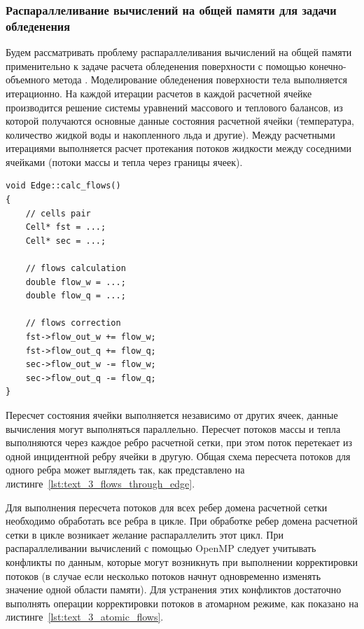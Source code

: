 \subsubsection{Распараллеливание вычислений на общей памяти для задачи обледенения}\label{sec:text_3_edge_coloring}

Будем рассматривать проблему распараллеливания вычислений на общей памяти применительно к задаче расчета обледенения поверхности с помощью конечно-объемного метода \cite{Gulicheva2024}.
Моделирование обледенения поверхности тела выполняется итерационно.
На каждой итерации расчетов в каждой расчетной ячейке производится решение системы уравнений массового и теплового балансов, из которой получаются основные данные состояния расчетной ячейки (температура, количество жидкой воды и накопленного льда и другие).
Между расчетными итерациями выполняется расчет протекания потоков жидкости между соседними ячейками (потоки массы и тепла через границы ячеек).

\begin{lstlisting}[caption={Расчет протекания потоков через ребро сетки.}, label={lst:text_3_flows_through_edge}]
void Edge::calc_flows()
{
    // cells pair
    Cell* fst = ...;
    Cell* sec = ...;

    // flows calculation
    double flow_w = ...;
    double flow_q = ...;

    // flows correction
    fst->flow_out_w += flow_w;
    fst->flow_out_q += flow_q;
    sec->flow_out_w -= flow_w;
    sec->flow_out_q -= flow_q;
}
\end{lstlisting}

Пересчет состояния ячейки выполняется независимо от других ячеек, данные вычисления могут выполняться параллельно.
Пересчет потоков массы и тепла выполняются через каждое ребро расчетной сетки, при этом поток перетекает из одной инцидентной ребру ячейки в другую.
Общая схема пересчета потоков для одного ребра может выглядеть так, как представлено на листинге~\ref{lst:text_3_flows_through_edge}.

Для выполнения пересчета потоков для всех ребер домена расчетной сетки необходимо обработать все ребра в цикле.
При обработке ребер домена расчетной сетки в цикле возникает желание распараллелить этот цикл.
При распараллеливании вычислений с помощью OpenMP следует учитывать конфликты по данным, которые могут возникнуть при выполнении корректировки потоков (в случае если несколько потоков начнут одновременно изменять значение одной области памяти).
Для устранения этих конфликтов достаточно выполнять операции корректировки потоков в атомарном режиме, как показано на листинге~\ref{lst:text_3_atomic_flows}.

